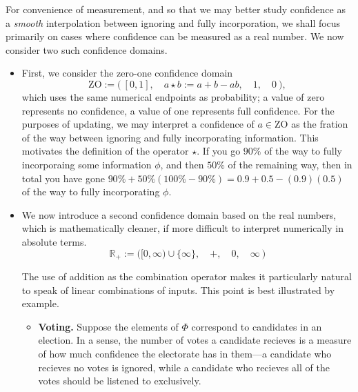 \documentclass{article}
\def\ZO{\mathrm{ZO}}
\def\Rplus{\mathbb R_+}
\begin{document}
For convenience of measurement, and so that we may better study confidence as a \emph{smooth} interpolation between ignoring and fully incorporation, we shall focus primarily on cases where confidence can be measured as a real number.
We now consider two such confidence domains.

\begin{itemize}
    \item 
    First, we consider the zero-one confidence domain
    \[
        \ZO := \Big(~ [0,1],
            \quad a \star b := 
                    a + b - ab,
            \quad 1,
            \quad 0 ~\Big),
    \]
    which uses the same numerical endpoints as probability;
    a value of zero represents no confidence, a value of one represents full confidence.
    For the purposes of updating, we may interpret a confidence of $a \in \ZO$ as the fration of the way between ignoring and fully incorporating information. 
    This motivates the definition of the operator $\star$.
    If you go $90\%$ of the way to fully incorporaing some information $\phi$, and then $50\%$ of the remaining way, then in total you have gone $90\% + 50\%(100\%-90\%) = 0.9 + 0.5 - (0.9)(0.5)$ of the way to fully incorporating $\phi$.    
    
    \item
    We now introduce a second confidence domain based on the real numbers,
    which is mathematically cleaner, if
        more difficult to interpret numerically in absolute terms.
    \[
        \Rplus := 
            \Big([0, \infty) \cup \{\infty\}, 
                \quad +,
                \quad 0,
                \quad \infty
                ~\Big)
    \]
    
    The use of addition as the combination operator makes it particularly natural to speak of linear combinations of inputs. 
    This point is best illustrated by example.
    
    \begin{itemize}
        \item \textbf{Voting.}  
        Suppose the elements of $\Phi$ correspond to candidates in an election.
        In a sense, the number of votes a candidate recieves is a measure of how much confidence the electorate has in them---a candidate who recieves no votes is ignored, while a candidate who recieves all of the votes should be listened to exclusively.
        

\end{itemize}
\end{itemize}
\end{document}
